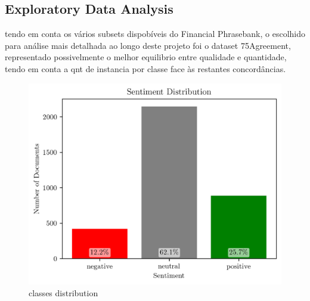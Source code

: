 \documentclass[conference]{IEEEtran}
\begin{document}



\subsection{Exploratory Data Analysis}

tendo em conta os vários subsets dispobíveis do Financial Phrasebank, o escolhido para análise mais detalhada ao longo deste projeto foi o dataset 75Agreement, representado possivelmente o melhor equilibrio entre qualidade e quantidade, tendo em conta a qnt de instancia por classe face às restantes concordâncias.

\begin{figure}[H]
    \centering
    \includegraphics[width=1\linewidth]{assets/sentiment_distribution.png}
    \caption{classes distribution}
    \label{fig:sentiment_distribution}
\end{figure}
\end{document}
